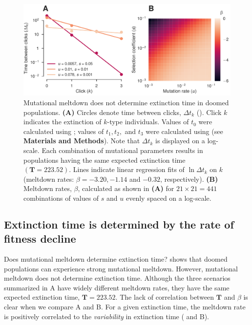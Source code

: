 \documentclass[9pt,lineno]{elife}
\begin{document}
\begin{figure}[ht!]
\centering
\includegraphics[width=.71\linewidth]{melt.pdf}
\caption{Mutational meltdown does not determine extinction time in doomed populations.  
%
\textbf{(A)} Circles denote time between clicks, $\Delta t_k$ ().  Click $k$ indicates the extinction of $k$-type individuals.  Values of $t_0$ were calculated using ; values of $t_1, t_2,$ and $t_3$ were calculated using  (see \textbf{Materials and Methods}).
Note that $\Delta t_k$ is displayed on a log-scale.  Each combination of mutational parameters results in populations having the same expected extinction time $(\mathbf{T} = 223.52)$.  Lines indicate linear regression fits of $\ln \Delta t_k$ on $k$ (meltdown rates: $\beta = -3.20, -1.14$ and $-0.32$, respectively).
%
\textbf{(B)} Meltdown rates, $\beta$, calculated as shown in \textbf{(A)} for $21\times21=441$ combinations of values of $s$ and $u$ evenly spaced on a log-scale.
}
\label{fig:melt}
\end{figure}


\subsection{Extinction time is determined by the rate of fitness decline}


Does mutational meltdown determine extinction time? 
%
 shows that doomed populations can experience strong mutational meltdown.  However, mutational meltdown does not determine extinction time.  Although the three scenarios summarized in A have widely different meltdown rates, they have the same expected extinction time, $\mathbf{T} = 223.52$.  The lack of correlation between $\mathbf{T}$ and $\beta$ is clear when we compare A and B.
For a given extinction time, the meltdown rate is positively correlated to the \textit{variability} in extinction time ( and B).
\end{document}
